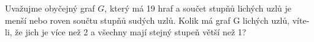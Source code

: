 \subsubsection{}
Uvažujme obyčejný graf $G$, který má 19 hraf a součet stupňů lichých uzlů je
menší nebo roven součtu stupňů sudých uzlů. Kolik má graf G lichých uzlů,
víte-li, že jich je více než 2 a všechny mají stejný stupeň větší než 1?
